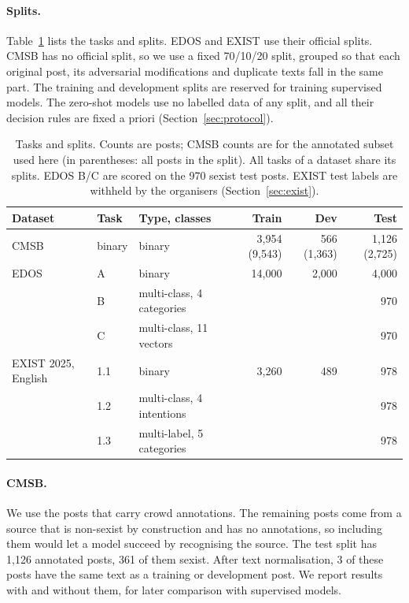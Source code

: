 \documentclass[11pt]{article}
\begin{document}
\paragraph{Splits.} Table~\ref{tab:tasks} lists the tasks and splits. EDOS and EXIST use their official splits. CMSB has no official split, so we use a fixed 70/10/20 split, grouped so that each original post, its adversarial modifications and duplicate texts fall in the same part. The training and development splits are reserved for training supervised models. The zero-shot models use no labelled data of any split, and all their decision rules are fixed a priori (Section~\ref{sec:protocol}).

\begin{table}[t]
\centering\footnotesize
\caption{Tasks and splits. Counts are posts; CMSB counts are for the annotated subset used here (in parentheses: all posts in the split). All tasks of a dataset share its splits. EDOS B/C are scored on the 970 sexist test posts. EXIST test labels are withheld by the organisers (Section~\ref{sec:exist}).}\label{tab:tasks}
\begin{tabular}{lllrrr}
\toprule
Dataset & Task & Type, classes & Train & Dev & Test \\
\midrule
CMSB \citep{samory2021callme} & binary & binary & 3{,}954 (9{,}543) & 566 (1{,}363) & 1{,}126 (2{,}725) \\
EDOS \citep{kirk2023semeval} & A & binary & 14{,}000 & 2{,}000 & 4{,}000 \\
 & B & multi-class, 4 categories & & & 970 \\
 & C & multi-class, 11 vectors & & & 970 \\
EXIST 2025, English \citep{plaza2025exist} & 1.1 & binary & 3{,}260 & 489 & 978 \\
 & 1.2 & multi-class, 4 intentions & & & 978 \\
 & 1.3 & multi-label, 5 categories & & & 978 \\
\bottomrule
\end{tabular}
\end{table}

\paragraph{CMSB.} We use the posts that carry crowd annotations. The remaining posts come from a source that is non-sexist by construction and has no annotations, so including them would let a model succeed by recognising the source. The test split has 1{,}126 annotated posts, 361 of them sexist. After text normalisation, 3 of these posts have the same text as a training or development post. We report results with and without them, for later comparison with supervised models.
\end{document}
